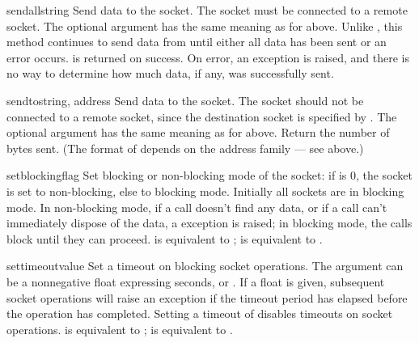 \begin{methoddesc}[socket]{sendall}{string}
Send data to the socket.  The socket must be connected to a remote
socket.  The optional  argument has the same meaning as for
 above.  Unlike , this method continues
to send data from  until either all data has been sent or
an error occurs.   is returned on success.  On error, an
exception is raised, and there is no way to determine how much data,
if any, was successfully sent.
\end{methoddesc}

\begin{methoddesc}[socket]{sendto}{string, address}
Send data to the socket.  The socket should not be connected to a
remote socket, since the destination socket is specified by
.  The optional  argument has the same
meaning as for  above.  Return the number of bytes sent.
(The format of  depends on the address family --- see above.)
\end{methoddesc}

\begin{methoddesc}[socket]{setblocking}{flag}
Set blocking or non-blocking mode of the socket: if  is 0,
the socket is set to non-blocking, else to blocking mode.  Initially
all sockets are in blocking mode.  In non-blocking mode, if a
 call doesn't find any data, or if a
 call can't immediately dispose of the data, a
 exception is raised; in blocking mode, the calls
block until they can proceed.
 is equivalent to ;
 is equivalent to .
\end{methoddesc}

\begin{methoddesc}[socket]{settimeout}{value}
Set a timeout on blocking socket operations.  The  argument
can be a nonnegative float expressing seconds, or .
If a float is
given, subsequent socket operations will raise an 
exception if the timeout period  has elapsed before the
operation has completed.  Setting a timeout of  disables
timeouts on socket operations.
 is equivalent to ;
 is equivalent to .
\end{methoddesc}

